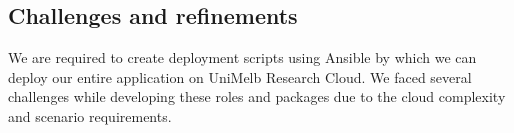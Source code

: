 
\newenvironment{flattened}{
  \setlength{\parindent}{0cm}
}{}

\newcommand\Challenge{%
  \stepcounter{problem}%
  \textbf{Challenge \theproblem.}~%
  \setcounter{solution}{0}%
}
\newcommand\TheSolution{%
  \textbf{Solution:}\\%
}
\newcommand\ASolution{%
  \stepcounter{solution}%
  \textbf{Solution \thesolution:}\\%
}

\subsection{Challenges and refinements}
We are required to create deployment scripts using Ansible by which we can deploy our entire application on UniMelb Research Cloud. We faced several challenges while developing these roles and packages due to the cloud complexity and scenario requirements.

